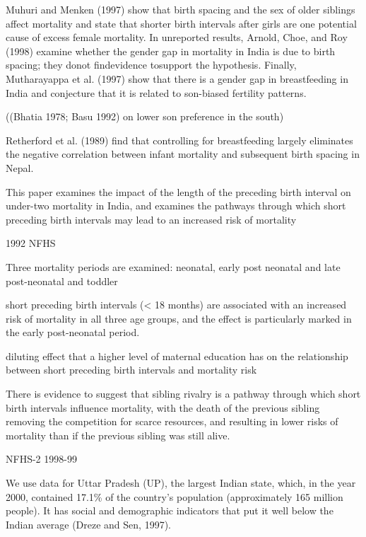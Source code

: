 Muhuri and Menken (1997) show that birth spacing and the sex of older
siblings affect mortality and state that shorter birth intervals after
girls are one potential cause of excess female mortality. In unreported
results, Arnold, Choe, and Roy (1998) examine whether the gender gap in
mortality in India is due to birth spacing; they donot findevidence
tosupport the hypothesis. Finally, Mutharayappa et al. (1997) show that
there is a gender gap in breastfeeding in India and conjecture that it
is related to son-biased fertility patterns.

((Bhatia 1978; Basu 1992) on lower son preference in the south)

Retherford et al. (1989) find that controlling for breastfeeding largely
eliminates the negative correlation between infant mortality and
subsequent birth spacing in Nepal.

\citep{Whitworth2002}

This paper examines the impact of the length of the preceding birth
interval on under-two mortality in India, and examines the pathways
through which short preceding birth intervals may lead to an increased
risk of mortality

1992 NFHS

Three mortality periods are examined: neonatal, early post neonatal and
late post-neonatal and toddler 

short preceding birth intervals (< 18 months) are associated with an
increased risk of mortality in all three age groups, and the effect is
particularly marked in the early post-neonatal period.

diluting effect that a higher level of maternal education has on the
relationship between short preceding birth intervals and mortality risk

There is evidence to suggest that sibling rivalry is a pathway through
which short birth intervals inﬂuence mortality, with the death of the
previous sibling removing the competition for scarce resources, and
resulting in lower risks of mortality than if the previous sibling was
still alive.


\citep{Bhalotra2008}

NFHS-2 1998-99

We use data for Uttar Pradesh (UP), the largest Indian state, which, in
the year 2000, contained 17.1\% of the country’s population
(approximately 165 million people). It has social and demographic
indicators that put it well below the Indian average (Dreze and Sen,
1997).

